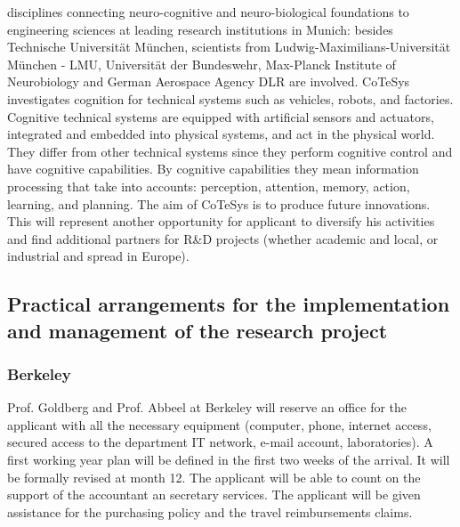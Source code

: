 disciplines    connecting    neuro-cognitive   and    neuro-biological
foundations to  engineering sciences at  leading research institutions
in  Munich: besides  Technische Universit\"at  M\"unchen,  scientists from
Ludwig-Maximilians-Universit\"at   M\"unchen   -   LMU,  Universit\"at   der
Bundeswehr, Max-Planck Institute  of Neurobiology and German Aerospace
Agency  DLR are involved. CoTeSys
investigates cognition for technical systems such as vehicles, robots,
and   factories.  Cognitive  technical   systems  are   equipped  with
artificial  sensors  and   actuators,  integrated  and  embedded  into
physical  systems, and  act in  the physical  world. They  differ from
other technical systems since  they perform cognitive control and have
cognitive   capabilities.   By   cognitive  capabilities   they   mean
information processing that take into accounts: perception, attention,
memory,  action, learning,  and planning.  The  aim of  CoTeSys is  to
produce future  innovations.  This will  represent another opportunity
for applicant to diversify his activities and find additional partners for R\&D
projects  (whether academic  and local,  or industrial  and  spread in
Europe).
\subsection{Practical arrangements for the implementation and 
management of the research project } 
\subsubsection{Berkeley}
Prof. Goldberg and Prof. Abbeel at Berkeley will reserve an office for the 
applicant with all the necessary equipment (computer, phone, internet access, 
secured access to the department IT network, e-mail account, laboratories).
A first working year plan will be defined in the first two weeks of the arrival. 
It will be formally revised at month 12. The applicant will be able to count on 
the support  of the accountant an secretary services. The applicant will be given 
assistance for the purchasing policy and the travel reimbursements claims.
